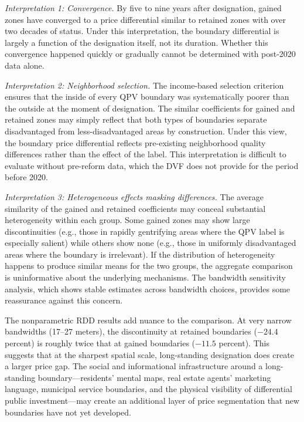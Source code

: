 \documentclass[12pt]{article}
\begin{document}
\textit{Interpretation 1: Convergence.} By five to nine years after designation, gained zones have converged to a price differential similar to retained zones with over two decades of status. Under this interpretation, the boundary differential is largely a function of the designation itself, not its duration. Whether this convergence happened quickly or gradually cannot be determined with post-2020 data alone.

\textit{Interpretation 2: Neighborhood selection.} The income-based selection criterion ensures that the inside of every QPV boundary was systematically poorer than the outside at the moment of designation. The similar coefficients for gained and retained zones may simply reflect that both types of boundaries separate disadvantaged from less-disadvantaged areas by construction. Under this view, the boundary price differential reflects pre-existing neighborhood quality differences rather than the effect of the label. This interpretation is difficult to evaluate without pre-reform data, which the DVF does not provide for the period before 2020.

\textit{Interpretation 3: Heterogeneous effects masking differences.} The average similarity of the gained and retained coefficients may conceal substantial heterogeneity within each group. Some gained zones may show large discontinuities (e.g., those in rapidly gentrifying areas where the QPV label is especially salient) while others show none (e.g., those in uniformly disadvantaged areas where the boundary is irrelevant). If the distribution of heterogeneity happens to produce similar means for the two groups, the aggregate comparison is uninformative about the underlying mechanisms. The bandwidth sensitivity analysis, which shows stable estimates across bandwidth choices, provides some reassurance against this concern.

The nonparametric RDD results add nuance to the comparison. At very narrow bandwidths (17--27 meters), the discontinuity at retained boundaries ($-24.4$ percent) is roughly twice that at gained boundaries ($-11.5$ percent). This suggests that at the sharpest spatial scale, long-standing designation does create a larger price gap. The social and informational infrastructure around a long-standing boundary---residents' mental maps, real estate agents' marketing language, municipal service boundaries, and the physical visibility of differential public investment---may create an additional layer of price segmentation that new boundaries have not yet developed.
\end{document}
